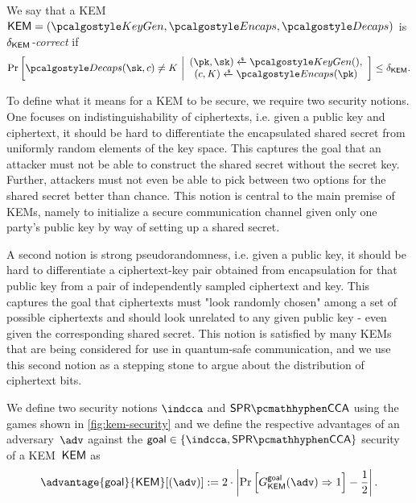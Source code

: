 \begin{definition}
\label{def:kem-corr}
We say that a KEM~$\KEM=(\kgen, \encaps, \decaps)$ is \emph{$\delta_{\mathsf{KEM}}$-correct} if
\[
    \Pr\left[
        \decaps(\sk,c) \neq K
    ~\middle|
        \begin{array}{c}
        (\pk,\sk) \getsr \kgen(), \\
        (c, K) \getsr \encaps(\pk)
        \end{array}
    \right] \leq \delta_\KEM.
\]
\end{definition}

To define what it means for a KEM to be secure, we require two security notions. One focuses on indistinguishability of ciphertexts, i.e. given a public key and ciphertext, it should be hard to differentiate the encapsulated shared secret from uniformly random elements of the key space. This captures the goal that an attacker must not be able to construct the shared secret without the secret key. Further, attackers must not even be able to pick between two options for the shared secret better than chance. This notion is central to the main premise of KEMs, namely to initialize a secure communication channel given only one party's public key by way of setting up a shared secret.

A second notion is strong pseudorandomness, i.e. given a public key, it should be hard to differentiate a ciphertext-key pair obtained from encapsulation for that public key from a pair of independently sampled ciphertext and key. This captures the goal that ciphertexts must "look randomly chosen" among a set of possible ciphertexts and should look unrelated to any given public key - even given the corresponding shared secret. This notion is satisfied by many KEMs that are being considered for use in quantum-safe communication, and we use this second notion as a stepping stone to argue about the distribution of ciphertext bits.

\begin{definition} \label{def:kem-security}
    We define two security notions $\indcca$ and $\sprcca$ using the games shown in \cref{fig:kem-security} and we define the respective advantages of an adversary~$\adv$ against the $\mathsf{goal} \in \{\indcca, \sprcca\}$ security of a KEM~$\mathsf{KEM}$ as
\[
    \advantage{\mathsf{goal}}{\KEM}[(\adv)] := 2 \cdot \left| \Pr \left[ G^{\mathsf{goal}}_{\KEM}(\adv) \Rightarrow 1 \right] - \frac{1}{2} \right|.
\]
\end{definition}

